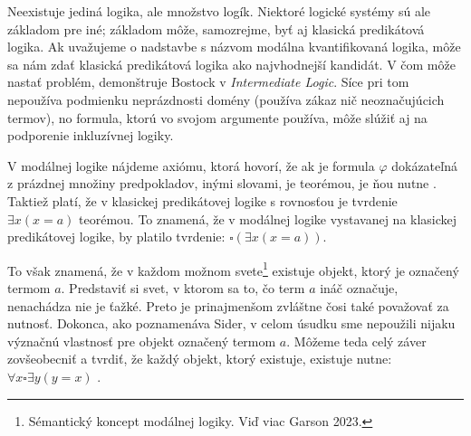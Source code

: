 \documentclass[12pt, letterpaper]{article}
\begin{document}
Neexistuje jediná logika, ale množstvo logík. Niektoré logické systémy sú ale základom pre iné; základom môže, samozrejme, byť aj klasická predikátová logika. Ak uvažujeme o nadstavbe s názvom modálna kvantifikovaná logika, môže sa nám zdať klasická predikátová logika ako najvhodnejší kandidát. V čom môže nastať problém, demonštruje Bostock v \textit{Intermediate Logic}. Síce pri tom nepoužíva podmienku neprázdnosti domény (používa zákaz nič neoznačujúcich termov), no formula, ktorú vo svojom argumente používa, môže slúžiť aj na podporenie inkluzívnej logiky.\par
V modálnej logike nájdeme axiómu, ktorá hovorí, že ak je formula $\varphi$ dokázateľná z prázdnej množiny predpokladov, inými slovami, je teorémou, je ňou nutne \parencites[]{sep-logic-modal}. Taktiež platí, že v klasickej predikátovej logike s rovnosťou je tvrdenie $\exists x ( x = a)$ teorémou. To znamená, že v modálnej logike vystavanej na klasickej predikátovej logike, by platilo tvrdenie: $\square(\exists x (x = a))$.\par
To však znamená, že v každom možnom svete\footnote{Sémantický koncept modálnej logiky. Viď viac Garson 2023.} existuje objekt, ktorý je označený termom $a$.
Predstaviť si svet, v ktorom sa to, čo term $a$ ináč označuje, nenachádza nie je ťažké. Preto je prinajmenšom zvláštne čosi také považovať za nutnosť. Dokonca, ako poznamenáva Sider, v celom úsudku sme nepoužili nijaku význačnú vlastnosť pre objekt označený termom $a$. Môžeme teda celý záver zovšeobecniť a tvrdiť, že každý objekt, ktorý existuje, existuje nutne: $\forall x \square \exists y ( y = x)$ \parencites[307]{Sider2009}. 
\end{document}

